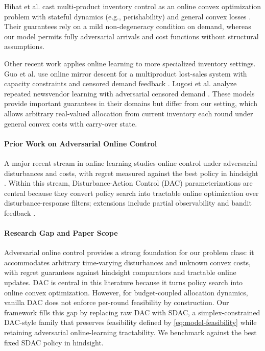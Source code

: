 \documentclass[11pt]{article}
\begin{document}
Hihat et al. cast multi-product inventory control as an online convex optimization problem with stateful dynamics (e.g., perishability) and general convex losses \cite{hihat2023inventory}. Their guarantees rely on a mild non-degeneracy condition on demand, whereas our model permits fully adversarial arrivals and cost functions without structural assumptions.

Other recent work applies online learning to more specialized inventory settings. Guo et al. use online mirror descent for a multiproduct lost-sales system with capacity constraints and censored demand feedback \cite{guo2024omd}. Lugosi et al. analyze repeated newsvendor learning with adversarial censored demand \cite{lugosi2024hardness}. These models provide important guarantees in their domains but differ from our setting, which allows arbitrary real-valued allocation from current inventory each round under general convex costs with carry-over state.



\paragraph{Prior Work on Adversarial Online Control} A major recent stream in online learning studies online control under adversarial disturbances and costs, with regret measured against the best policy in hindsight \cite{agarwal2019online,agarwal2019logarithmic,hazan2020nonstochasticBandit,simchowitz2020improper,hazan_introduction_2025}. Within this stream, Disturbance-Action Control (DAC) parameterizations are central because they convert policy search into tractable online optimization over disturbance-response filters; extensions include partial observability and bandit feedback \cite{lale2020logarithmic,hazan2020nonstochasticBandit}.

\paragraph{Research Gap and Paper Scope} Adversarial online control provides a strong foundation for our problem class: it accommodates arbitrary time-varying disturbances and unknown convex costs, with regret guarantees against hindsight comparators and tractable online updates. DAC is central in this literature because it turns policy search into online convex optimization. However, for budget-coupled allocation dynamics, vanilla DAC does not enforce per-round feasibility by construction. Our framework fills this gap by replacing raw DAC with SDAC, a simplex-constrained DAC-style family that preserves feasibility defined by \eqref{eq:model-feasibility} while retaining adversarial online-learning tractability. We benchmark against the best fixed SDAC policy in hindsight.
\end{document}
